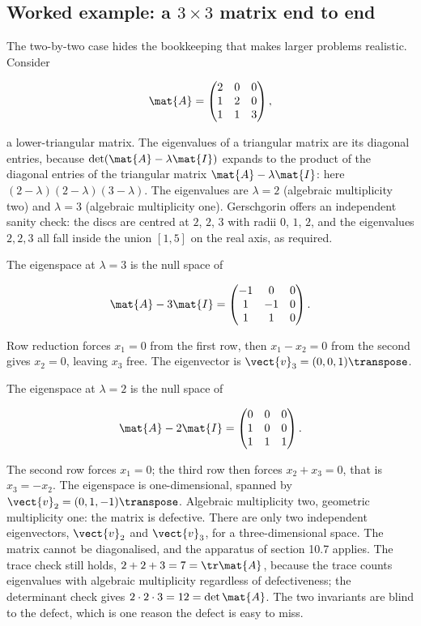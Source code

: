\subsection{Worked example: a $3 \times 3$ matrix end to end}

The two-by-two case hides the bookkeeping that makes larger
problems realistic. Consider

\[
\mat{A} = \begin{pmatrix} 2 & 0 & 0 \\ 1 & 2 & 0 \\ 1 & 1 & 3
\end{pmatrix},
\]

a lower-triangular matrix. The eigenvalues of a triangular matrix
are its diagonal entries, because $\det(\mat{A} - \lambda \mat{I})$
expands to the product of the diagonal entries of the triangular
matrix $\mat{A} - \lambda \mat{I}$: here
$(2 - \lambda)(2 - \lambda)(3 - \lambda)$. The eigenvalues are
$\lambda = 2$ (algebraic multiplicity two) and $\lambda = 3$
(algebraic multiplicity one). Gerschgorin offers an independent
sanity check: the discs are centred at $2$, $2$, $3$ with radii
$0$, $1$, $2$, and the eigenvalues $2, 2, 3$ all fall inside the
union $[1, 5]$ on the real axis, as required.

The eigenspace at $\lambda = 3$ is the null space of

\[
\mat{A} - 3\mat{I} = \begin{pmatrix} -1 & 0 & 0 \\ 1 & -1 & 0 \\
1 & 1 & 0 \end{pmatrix}.
\]

Row reduction forces $x_{1} = 0$ from the first row, then
$x_{1} - x_{2} = 0$ from the second gives $x_{2} = 0$, leaving
$x_{3}$ free. The eigenvector is $\vect{v}_{3} = (0, 0, 1)
\transpose$.

The eigenspace at $\lambda = 2$ is the null space of

\[
\mat{A} - 2\mat{I} = \begin{pmatrix} 0 & 0 & 0 \\ 1 & 0 & 0 \\
1 & 1 & 1 \end{pmatrix}.
\]

The second row forces $x_{1} = 0$; the third row then forces
$x_{2} + x_{3} = 0$, that is $x_{3} = -x_{2}$. The eigenspace is
one-dimensional, spanned by $\vect{v}_{2} = (0, 1, -1)\transpose$.
Algebraic multiplicity two, geometric multiplicity one: the matrix
is defective. There are only two independent eigenvectors,
$\vect{v}_{2}$ and $\vect{v}_{3}$, for a three-dimensional space.
The matrix cannot be diagonalised, and the apparatus of section 10.7
applies. The trace check still holds, $2 + 2 + 3 = 7 = \tr \mat{A}$,
because the trace counts eigenvalues with algebraic multiplicity
regardless of defectiveness; the determinant check gives
$2 \cdot 2 \cdot 3 = 12 = \det \mat{A}$. The two invariants are
blind to the defect, which is one reason the defect is easy to miss.

